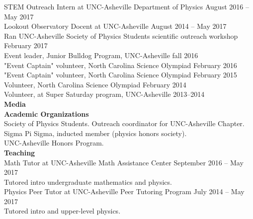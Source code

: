 \documentclass[a4paper, 11pt]{article}
\newcommand{\noi}{\noindent}
\begin{document}
\noi STEM Outreach Intern at UNC-Asheville Department of Physics \hfill August 2016 -- May 2017
\\

\noi Lookout Observatory Docent at UNC-Asheville \hfill August 2014 -- May 2017
\\

\noi Ran UNC-Asheville Society of Physics Students scientific outreach workshop \hfill February 2017
\\

\noi Event leader, Junior Bulldog Program, UNC-Asheville \hfill fall 2016 
\\

\noi "Event Captain" volunteer, North Carolina Science Olympiad \hfill February 2016
\\

\noi "Event Captain" volunteer, North Carolina Science Olympiad \hfill February 2015
\\

\noi Volunteer, North Carolina Science Olympiad \hfill February 2014
\\

\noi Volunteer, at Super Saturday program, UNC-Asheville \hfill 2013--2014
\\

\noi \textbf{Media}
\\

\noi \textbf{Academic Organizations}
\\

\noi Society of Physics Students. Outreach coordinator for UNC-Asheville Chapter.
\\

\noi Sigma Pi Sigma, inducted member (physics honors society).
\\

\noi UNC-Asheville Honors Program.
\\

\noi \textbf{Teaching}
\\

\noi Math Tutor at UNC-Asheville Math Assistance Center \hfill September 2016 -- May 2017
\\
Tutored intro undergraduate mathematics and physics.
\\

\noi Physics Peer Tutor at UNC-Asheville Peer Tutoring Program \hfill July 2014 -- May 2017
\\
Tutored intro and upper-level physics.
\\
\end{document}
